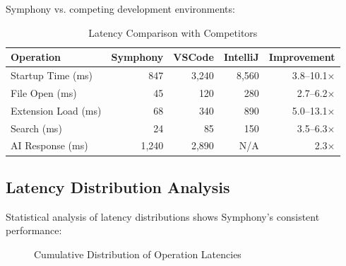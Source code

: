Symphony vs. competing development environments:

\begin{table}[ht]
\centering
\caption{Latency Comparison with Competitors}
\label{tab:competitive-latency}
\begin{tabular}{@{}lrrrr@{}}
\toprule
\textbf{Operation} & \textbf{Symphony} & \textbf{VSCode} & \textbf{IntelliJ} & \textbf{Improvement} \\
\midrule
Startup Time (ms) & 847 & 3,240 & 8,560 & 3.8--10.1× \\
File Open (ms) & 45 & 120 & 280 & 2.7--6.2× \\
Extension Load (ms) & 68 & 340 & 890 & 5.0--13.1× \\
Search (ms) & 24 & 85 & 150 & 3.5--6.3× \\
AI Response (ms) & 1,240 & 2,890 & N/A & 2.3× \\
\bottomrule
\end{tabular}
\end{table}

\subsection*{Latency Distribution Analysis}

Statistical analysis of latency distributions shows Symphony's consistent performance:

\begin{figure}[htb]
\centering
{}
\caption{Cumulative Distribution of Operation Latencies}
\label{fig:latency-distribution}
\end{figure}

